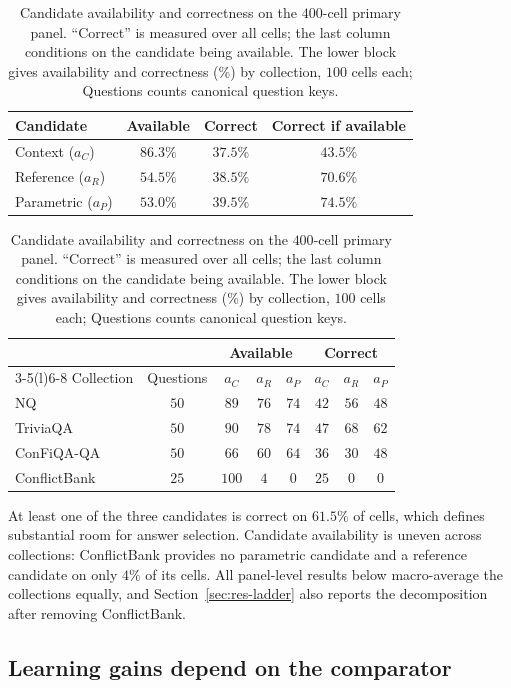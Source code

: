 \documentclass[sigconf]{acmart}
\newcommand{\ac}{a_C}
\newcommand{\ar}{a_R}
\newcommand{\ap}{a_P}
\begin{document}
\begin{table}[t]
\centering
\small
\caption{Candidate availability and correctness on the $400$-cell
primary panel. ``Correct'' is measured over all cells; the last column
conditions on the candidate being available. The lower block gives
availability and correctness (\%) by collection, $100$ cells each;
Questions counts canonical question keys.}
\label{tab:candidate-stats}
\begin{tabular}{@{}lccc@{}}
\toprule
Candidate & Available & Correct & Correct if available \\
\midrule
Context ($\ac$)    & $86.3\%$ & $37.5\%$ & $43.5\%$ \\
Reference ($\ar$)  & $54.5\%$ & $38.5\%$ & $70.6\%$ \\
Parametric ($\ap$) & $53.0\%$ & $39.5\%$ & $74.5\%$ \\
\bottomrule
\end{tabular}

\vspace{4pt}
\begin{tabular}{@{}lccccccc@{}}
\toprule
& & \multicolumn{3}{c}{Available} & \multicolumn{3}{c}{Correct} \\
\cmidrule(lr){3-5}\cmidrule(l){6-8}
Collection & Questions & $\ac$ & $\ar$ & $\ap$ & $\ac$ & $\ar$ & $\ap$ \\
\midrule
NQ           & $50$ & $89$  & $76$ & $74$ & $42$ & $56$ & $48$ \\
TriviaQA     & $50$ & $90$  & $78$ & $74$ & $47$ & $68$ & $62$ \\
ConFiQA-QA   & $50$ & $66$  & $60$ & $64$ & $36$ & $30$ & $48$ \\
ConflictBank & $25$ & $100$ & $4$  & $0$  & $25$ & $0$  & $0$ \\
\bottomrule
\end{tabular}
\end{table}

At least one of the three candidates is correct on $61.5\%$ of cells,
which defines substantial room for answer selection. Candidate
availability is uneven across collections: ConflictBank provides no
parametric candidate and a reference candidate on only $4\%$ of its
cells. All panel-level results below macro-average the collections
equally, and Section~\ref{sec:res-ladder} also reports the decomposition
after removing ConflictBank.

\subsection{Learning gains depend on the comparator}
\label{sec:res-select}
\end{document}
